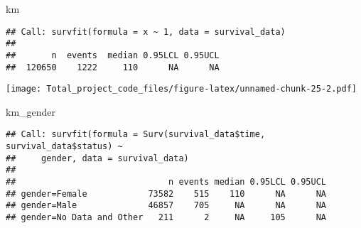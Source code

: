\documentclass[]{article}
\newenvironment{Shaded}{\begin{snugshade}}{\end{snugshade}}
\newcommand{\KeywordTok}[1]{\textcolor[rgb]{0.13,0.29,0.53}{\textbf{#1}}}
\newcommand{\DataTypeTok}[1]{\textcolor[rgb]{0.13,0.29,0.53}{#1}}
\newcommand{\DecValTok}[1]{\textcolor[rgb]{0.00,0.00,0.81}{#1}}
\newcommand{\StringTok}[1]{\textcolor[rgb]{0.31,0.60,0.02}{#1}}
\newcommand{\CommentTok}[1]{\textcolor[rgb]{0.56,0.35,0.01}{\textit{#1}}}
\newcommand{\OperatorTok}[1]{\textcolor[rgb]{0.81,0.36,0.00}{\textbf{#1}}}
\newcommand{\NormalTok}[1]{#1}
\begin{document}
\begin{Shaded}
\begin{Highlighting}[]
\NormalTok{km}
\end{Highlighting}
\end{Shaded}

\begin{verbatim}
## Call: survfit(formula = x ~ 1, data = survival_data)
## 
##       n  events  median 0.95LCL 0.95UCL 
##  120650    1222     110      NA      NA
\end{verbatim}

\begin{Shaded}
\end{Shaded}

\texttt{[image: Total\_project\_code\_files/figure-latex/unnamed-chunk-25-2.pdf]}

\begin{Shaded}
\begin{Highlighting}[]
\NormalTok{km_gender}
\end{Highlighting}
\end{Shaded}

\begin{verbatim}
## Call: survfit(formula = Surv(survival_data$time, survival_data$status) ~ 
##     gender, data = survival_data)
## 
##                              n events median 0.95LCL 0.95UCL
## gender=Female            73582    515    110      NA      NA
## gender=Male              46857    705     NA      NA      NA
## gender=No Data and Other   211      2     NA     105      NA
\end{verbatim}
\end{document}
